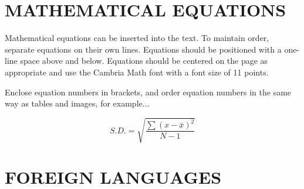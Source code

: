 
\section{MATHEMATICAL EQUATIONS}

Mathematical equations can be inserted into the text. To maintain order, separate equations on their own lines. Equations should be positioned with a one-line space above and below. Equations should be centered on the page as appropriate and use the Cambria Math font with a font size of 11 points.

Enclose equation numbers in brackets, and order equation numbers in the same way as tables and images, for example...

\begin{equation}
S.D. = \sqrt{\frac{\sum(x - \bar{x})^2}{N - 1}}
\label{eq:3.1}
\end{equation}

\section{FOREIGN LANGUAGES}

